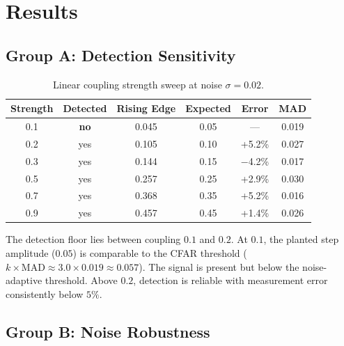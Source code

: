 \section{Results}
\label{sec:results}

\subsection{Group A: Detection Sensitivity}



\begin{table}[h]
\centering
\caption{Linear coupling strength sweep at noise $\sigma = 0.02$.}
\label{tab:strength}
\begin{tabular}{cccccc}
  \toprule
  Strength & Detected & Rising Edge & Expected & Error & MAD \\
  \midrule
  0.1 & \textbf{no}  & 0.045  & 0.05 & ---  & 0.019 \\
  0.2 & yes          & 0.105  & 0.10 & +5.2\% & 0.027 \\
  0.3 & yes          & 0.144  & 0.15 & $-$4.2\% & 0.017 \\
  0.5 & yes          & 0.257  & 0.25 & +2.9\% & 0.030 \\
  0.7 & yes          & 0.368  & 0.35 & +5.2\% & 0.016 \\
  0.9 & yes          & 0.457  & 0.45 & +1.4\% & 0.026 \\
  \bottomrule
\end{tabular}
\end{table}

The detection floor lies between coupling $0.1$ and $0.2$. At $0.1$,
the planted step amplitude ($0.05$) is comparable to the CFAR
threshold ($k \times \mathrm{MAD} \approx 3.0 \times 0.019 \approx
0.057$). The signal is present but below the noise-adaptive
threshold. Above $0.2$, detection is reliable with measurement error
consistently below $5\%$.

\subsection{Group B: Noise Robustness}

